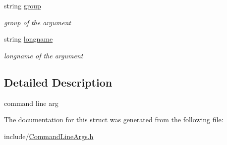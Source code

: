 \begin{DoxyCompactItemize}
\mbox{\label{structcommandLineArg__t_af9f59b1b39bbb0462228f3fb38e88b10}} 
string \hyperlink{structcommandLineArg__t_af9f59b1b39bbb0462228f3fb38e88b10}{group}
\begin{DoxyCompactList}\small\item\em group of the argument \end{DoxyCompactList}\item 
\mbox{\label{structcommandLineArg__t_a7fbd7b4bc8e545801a8551a80214e7c9}} 
string \hyperlink{structcommandLineArg__t_a7fbd7b4bc8e545801a8551a80214e7c9}{longname}
\begin{DoxyCompactList}\small\item\em longname of the argument \end{DoxyCompactList}\end{DoxyCompactItemize}


\subsection{Detailed Description}
command line arg 

The documentation for this struct was generated from the following file\+:\begin{DoxyCompactItemize}
\item 
include/\hyperlink{CommandLineArgs_8h}{Command\+Line\+Args.\+h}\end{DoxyCompactItemize}
